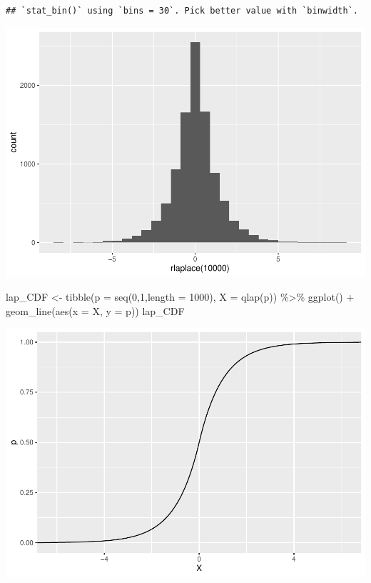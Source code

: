 \documentclass[
]{article}
\newenvironment{Shaded}{\begin{snugshade}}{\end{snugshade}}
\newcommand{\AttributeTok}[1]{\textcolor[rgb]{0.77,0.63,0.00}{#1}}
\newcommand{\DecValTok}[1]{\textcolor[rgb]{0.00,0.00,0.81}{#1}}
\newcommand{\FunctionTok}[1]{\textcolor[rgb]{0.00,0.00,0.00}{#1}}
\newcommand{\NormalTok}[1]{#1}
\newcommand{\OtherTok}[1]{\textcolor[rgb]{0.56,0.35,0.01}{#1}}
\newcommand{\SpecialCharTok}[1]{\textcolor[rgb]{0.00,0.00,0.00}{#1}}
\begin{document}
\begin{verbatim}
## `stat_bin()` using `bins = 30`. Pick better value with `binwidth`.
\end{verbatim}

\includegraphics{HW-3_files/figure-latex/unnamed-chunk-4-1.pdf}

\begin{Shaded}
\begin{Highlighting}[]
\NormalTok{lap\_CDF }\OtherTok{\textless{}{-}} \FunctionTok{tibble}\NormalTok{(}\AttributeTok{p =} \FunctionTok{seq}\NormalTok{(}\DecValTok{0}\NormalTok{,}\DecValTok{1}\NormalTok{,}\AttributeTok{length =} \DecValTok{1000}\NormalTok{),}
              \AttributeTok{X =} \FunctionTok{qlap}\NormalTok{(p)) }\SpecialCharTok{\%\textgreater{}\%} 
  \FunctionTok{ggplot}\NormalTok{() }\SpecialCharTok{+}
  \FunctionTok{geom\_line}\NormalTok{(}\FunctionTok{aes}\NormalTok{(}\AttributeTok{x =}\NormalTok{ X, }\AttributeTok{y =}\NormalTok{ p))}
\NormalTok{lap\_CDF}
\end{Highlighting}
\end{Shaded}

\includegraphics{HW-3_files/figure-latex/unnamed-chunk-4-2.pdf}
\end{document}
